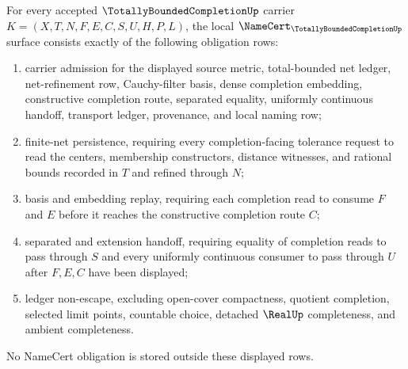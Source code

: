 
\begin{theorem}
\label{thm:totally-bounded-completion-namecert-obligations}
For every accepted $\TotallyBoundedCompletionUp$ carrier
$K=(X,T,N,F,E,C,S,U,H,P,L)$, the local $\NameCert_{\TotallyBoundedCompletionUp}$ surface consists exactly of the following obligation rows:
\begin{enumerate}
\item carrier admission for the displayed source metric, total-bounded net ledger, net-refinement row, Cauchy-filter basis, dense completion embedding, constructive completion route, separated equality, uniformly continuous handoff, transport ledger, provenance, and local naming row;
\item finite-net persistence, requiring every completion-facing tolerance request to read the centers, membership constructors, distance witnesses, and rational bounds recorded in $T$ and refined through $N$;
\item basis and embedding replay, requiring each completion read to consume $F$ and $E$ before it reaches the constructive completion route $C$;
\item separated and extension handoff, requiring equality of completion reads to pass through $S$ and every uniformly continuous consumer to pass through $U$ after $F,E,C$ have been displayed;
\item ledger non-escape, excluding open-cover compactness, quotient completion, selected limit points, countable choice, detached $\RealUp$ completeness, and ambient completeness.
\end{enumerate}
No NameCert obligation is stored outside these displayed rows.
\end{theorem}
